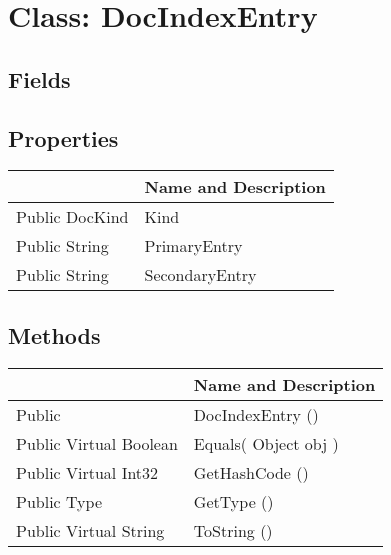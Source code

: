 \documentclass[11pt, oneside, a4paper]{book}
\begin{document}
\hypertarget{SoftwareEngineeringTools.{}Documentation.{}DocIndexEntry}{}
\section{Class: DocIndexEntry}

\subsection{Fields}

\subsection{Properties}
\begin{center}
\begin{tabular}{| p{3cm} | p{12cm} | }
\hline
\textbf{ } & \textbf{ Name and Description}\\
\hline
 Public  DocKind &  Kind\hypertarget{SoftwareEngineeringTools.{}Documentation.{}DocIndexEntry.{}Kind}{}\\
\hline
 Public  String &  PrimaryEntry\hypertarget{SoftwareEngineeringTools.{}Documentation.{}DocIndexEntry.{}PrimaryEntry}{}\\
\hline
 Public  String &  SecondaryEntry\hypertarget{SoftwareEngineeringTools.{}Documentation.{}DocIndexEntry.{}SecondaryEntry}{}\\
\hline
\end{tabular}
\end{center}

\subsection{Methods}
\begin{center}
\begin{tabular}{| p{3cm} | p{12cm} | }
\hline
\textbf{ } & \textbf{ Name and Description}\\
\hline
 Public  &  DocIndexEntry ()\hypertarget{SoftwareEngineeringTools.{}Documentation.{}DocIndexEntry.{}DocIndexEntry}{}\\
\hline
 Public  Virtual  Boolean &  Equals(\hypertarget{SoftwareEngineeringTools.{}Documentation.{}DocIndexEntry.{}Equals\_Object}{} Object  obj  )\\
\hline
 Public  Virtual  Int32 &  GetHashCode ()\hypertarget{SoftwareEngineeringTools.{}Documentation.{}DocIndexEntry.{}GetHashCode}{}\\
\hline
 Public  Type &  GetType ()\hypertarget{SoftwareEngineeringTools.{}Documentation.{}DocIndexEntry.{}GetType}{}\\
\hline
 Public  Virtual  String &  ToString ()\hypertarget{SoftwareEngineeringTools.{}Documentation.{}DocIndexEntry.{}ToString}{}\\
\hline
\end{tabular}
\end{center}
 
\end{document}

